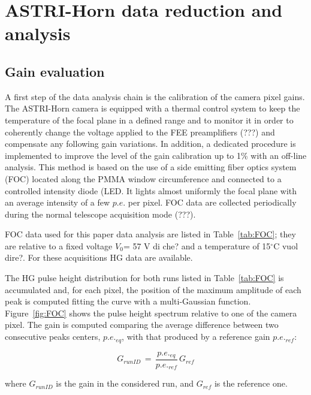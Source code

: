 \section{ASTRI-Horn data reduction and analysis} 
\label{sect:astridata}

\subsection{Gain evaluation}
\label{subs:gain}

A first step of the data analysis chain is the calibration of the camera pixel gains. 
The ASTRI-Horn camera is equipped with a thermal control system to keep the temperature of the focal plane in a defined range and to monitor it in order to coherently change the voltage applied to the FEE preamplifiers (???) and compensate any following  gain variations. In addition, a dedicated procedure is implemented to improve the level of the gain calibration up to 1\% with an off-line analysis. This method is based on the use of a side emitting fiber optics system (FOC) located along the PMMA window circumference and connected to a controlled intensity diode (LED. It lights almost uniformly the focal plane with an average intensity of a few $p.e.$ per pixel. FOC data are collected periodically during the normal telescope acquisition mode (???).

FOC data used for this paper data analysis are listed in Table~\ref{tab:FOC}; they are relative to a fixed voltage $V_{0}$= 57 V {\tem di che?} and a temperature of 15$^\circ$C {\che vuol dire?}. For these acquisitions HG data are available.

The HG pulse height distribution for both runs listed in Table~\ref{tab:FOC} is accumulated and, for each pixel, the position of the maximum amplitude of each peak is computed fitting the curve with a multi-Gaussian function. Figure~\ref{fig:FOC} shows the pulse height spectrum relative to one of the camera pixel. The gain is computed comparing the average difference between two consecutive peaks centers, $p.e._{eq}$, with that produced by a reference gain $p.e._{ref}$:

\begin{equation}
G_{run ID}\,=\,\frac{p.e._{eq}}{p.e._{ref}}\,G_{ref}
\end{equation}

\noindent
where $G_{run ID}$ is the gain in the considered run, and $G_{ref}$ is the reference one.

